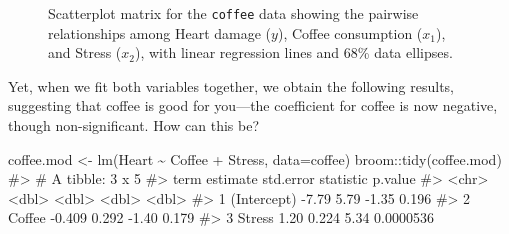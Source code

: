 \documentclass[
  letterpaper,
  10pt,
  krantz2]{krantz}
\makeatletter
\newenvironment{Shaded}{\begin{snugshade}}{\end{snugshade}}
\newcommand{\AttributeTok}[1]{\textcolor[rgb]{0.40,0.45,0.13}{#1}}
\newcommand{\CommentTok}[1]{\textcolor[rgb]{0.37,0.37,0.37}{#1}}
\newcommand{\FunctionTok}[1]{\textcolor[rgb]{0.28,0.35,0.67}{#1}}
\newcommand{\NormalTok}[1]{\textcolor[rgb]{0.00,0.23,0.31}{#1}}
\newcommand{\OtherTok}[1]{\textcolor[rgb]{0.00,0.23,0.31}{#1}}
\newcommand{\SpecialCharTok}[1]{\textcolor[rgb]{0.37,0.37,0.37}{#1}}
\newenvironment{kframe}{%
  \medskip{}
  \setlength{\fboxsep}{.8em}
  \def\at@end@of@kframe{}%
  \ifinner\ifhmode%
  \def\at@end@of@kframe{\end{minipage}}%
  \begin{minipage}{\columnwidth}%
  \fi\fi%
  \def\FrameCommand##1{\hskip\@totalleftmargin \hskip-\fboxsep
  \colorbox{shadecolor}{##1}\hskip-\fboxsep
      \hskip-\linewidth \hskip-\@totalleftmargin \hskip\columnwidth}%
  \MakeFramed {\advance\hsize-\width
    \@totalleftmargin\z@ \linewidth\hsize
    \@setminipage}}%
{\par\unskip\endMakeFramed%
  \at@end@of@kframe}
\renewenvironment{Shaded}{\begin{kframe}}{\end{kframe}}
\makeatother
\begin{document}
\begin{figure}


\caption{\label{fig-coffee-scatmat}Scatterplot matrix for the
\texttt{coffee} data showing the pairwise relationships among Heart
damage (\(y\)), Coffee consumption (\(x_1\)), and Stress (\(x_2\)), with
linear regression lines and 68\% data ellipses.}

\end{figure}%

Yet, when we fit both variables together, we obtain the following
results, suggesting that coffee is good for you---the coefficient for
coffee is now negative, though non-significant. How can this be?

\begin{Shaded}
\begin{Highlighting}[]
\NormalTok{coffee.mod }\OtherTok{\textless{}{-}} \FunctionTok{lm}\NormalTok{(Heart }\SpecialCharTok{\textasciitilde{}}\NormalTok{ Coffee }\SpecialCharTok{+}\NormalTok{ Stress, }\AttributeTok{data=}\NormalTok{coffee)}
\NormalTok{broom}\SpecialCharTok{::}\FunctionTok{tidy}\NormalTok{(coffee.mod)}
\CommentTok{\#\textgreater{} \# A tibble: 3 x 5}
\CommentTok{\#\textgreater{}   term        estimate std.error statistic   p.value}
\CommentTok{\#\textgreater{}   \textless{}chr\textgreater{}          \textless{}dbl\textgreater{}     \textless{}dbl\textgreater{}     \textless{}dbl\textgreater{}     \textless{}dbl\textgreater{}}
\CommentTok{\#\textgreater{} 1 (Intercept)   {-}7.79      5.79      {-}1.35 0.196    }
\CommentTok{\#\textgreater{} 2 Coffee        {-}0.409     0.292     {-}1.40 0.179    }
\CommentTok{\#\textgreater{} 3 Stress         1.20      0.224      5.34 0.0000536}
\end{Highlighting}
\end{Shaded}
\end{document}

